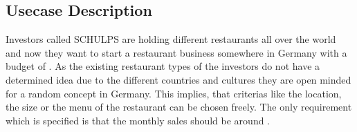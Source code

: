 \subsection{Usecase Description}
\label{subsec:usecase}
Investors called SCHULPS are holding different restaurants all over the world and now they want to start a restaurant business somewhere in Germany with a budget of .  As the existing restaurant types of the investors do not have a determined idea due to the different countries and cultures they are open minded for a random concept in Germany. This implies, that criterias like the location, the size or the menu of the restaurant can be chosen freely. The only requirement which is specified is that the monthly sales should be around .